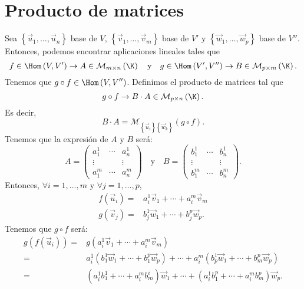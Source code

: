\section{Producto de matrices}

Sea $\displaystyle \left\{ \vec{u}_{1}, \ldots, \vec{u}_{n}\right\}  $ base de $\displaystyle V $, $\displaystyle \left\{ \vec{v}_{1}, \ldots, \vec{v}_{m}\right\}  $ base de $\displaystyle V' $ y $\displaystyle \left\{ \vec{w}_{1}, \ldots, \vec{w}_{p}\right\}  $ base de $\displaystyle V'' $. Entonces, podemos encontrar aplicaciones lineales tales que 
\[ f \in \Hom\left(V, V'\right) \to A \in \mathcal{M}_{m\times n}\left(\K\right) \quad \text{y} \quad g \in \Hom\left(V', V''\right) \to B \in \mathcal{M}_{p\times m}\left(\K\right) .\]
Tenemos que $\displaystyle g \circ f \in \Hom\left(V, V''\right) $. Definimos el producto de matrices tal que
\[g \circ f \to B \cdot A \in \mathcal{M}_{p\times n}\left(\K\right) .\]
Es decir, 
\[B \cdot A = \mathcal{M}_{ \left\{ \vec{u}_{i}\right\} \left\{ \vec{w}_{k}\right\} }\left(g \circ f\right) .\]
Tenemos que la expresión de $\displaystyle A $ y $\displaystyle B $ será:
\[ A = \begin{pmatrix} 
	a^{1}_{1} & \cdots & a^{1}_{n} \\
	\vdots & & \vdots \\
	a^{m}_{1} & \cdots & a^{m}_{n}
\end{pmatrix} \quad \text{y} \quad B = \begin{pmatrix} 
	b^{1}_{1} & \cdots & b^{1}_{n} \\
	\vdots & & \vdots \\
	b^{m}_{1} & \cdots & b^{m}_{n}
\end{pmatrix}.\]
Entonces, $\displaystyle \forall i = 1, \ldots, m $ y $\displaystyle \forall j = 1, \ldots, p $, 
\[
\begin{split}
	f\left(\vec{u}_{i}\right) = & a^{1}_{i}\vec{v}_{1} + \cdots + a^{m}_{i}\vec{v}_{m}\\
	g\left(\vec{v}_{j}\right)= & b^{1}_{j}\vec{w}_{1} + \cdots + b^{p}_{j}\vec{w}_{p} .
\end{split}
\]
Tenemos que $\displaystyle g \circ f $ será:
\[
\begin{split}
	g\left(f\left(\vec{u}_{i}\right)\right) = & g\left(a^{1}_{i}\vec{v}_{1} + \cdots +a^{m}_{i}\vec{v}_{m}\right) \\
	= & a^{1}_{i}\left(b^{1}_{1}\vec{w}_{1} + \cdots + b^{p}_{1}\vec{w}_{p}\right) + \cdots + a^{m}_{i}\left(b^{1}_{p}\vec{w}_{1} + \cdots + b^{p}_{m}\vec{w}_{p}\right) \\
	= & \left(a^{1}_{i}b^{1}_{1} + \cdots + a^{m}_{i}b^{i}_{m}\right)\vec{w}_{1} + \cdots + \left(a^{1}_{i}b^{p}_{1} + \cdots + a^{m}_{i}b^{p}_{m}\right)\vec{w}_{p} .
\end{split}
\]

